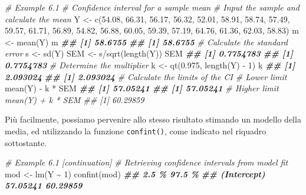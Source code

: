 \documentclass[
  12pt,
]{book}
\newenvironment{Shaded}{\begin{snugshade}}{\end{snugshade}}
\newcommand{\CommentTok}[1]{\textcolor[rgb]{0.56,0.35,0.01}{\textit{#1}}}
\newcommand{\DecValTok}[1]{\textcolor[rgb]{0.00,0.00,0.81}{#1}}
\newcommand{\DocumentationTok}[1]{\textcolor[rgb]{0.56,0.35,0.01}{\textbf{\textit{#1}}}}
\newcommand{\FloatTok}[1]{\textcolor[rgb]{0.00,0.00,0.81}{#1}}
\newcommand{\FunctionTok}[1]{\textcolor[rgb]{0.00,0.00,0.00}{#1}}
\newcommand{\NormalTok}[1]{#1}
\newcommand{\OtherTok}[1]{\textcolor[rgb]{0.56,0.35,0.01}{#1}}
\newcommand{\SpecialCharTok}[1]{\textcolor[rgb]{0.00,0.00,0.00}{#1}}
\begin{document}
\begin{Shaded}
\begin{Highlighting}[]
\CommentTok{\# Example 6.1}
\CommentTok{\# Confidence interval for a sample mean}
\CommentTok{\# Input the sample and calculate the mean}
\NormalTok{Y }\OtherTok{\textless{}{-}} \FunctionTok{c}\NormalTok{(}\FloatTok{54.08}\NormalTok{, }\FloatTok{66.31}\NormalTok{, }\FloatTok{56.17}\NormalTok{, }\FloatTok{56.32}\NormalTok{, }\FloatTok{52.01}\NormalTok{, }\FloatTok{58.91}\NormalTok{, }\FloatTok{58.74}\NormalTok{, }\FloatTok{57.49}\NormalTok{,}
\FloatTok{59.57}\NormalTok{, }\FloatTok{61.71}\NormalTok{, }\FloatTok{56.89}\NormalTok{, }\FloatTok{54.82}\NormalTok{, }\FloatTok{56.88}\NormalTok{, }\FloatTok{60.05}\NormalTok{, }\FloatTok{59.39}\NormalTok{, }\FloatTok{57.19}\NormalTok{,}
\FloatTok{64.76}\NormalTok{, }\FloatTok{61.36}\NormalTok{, }\FloatTok{62.03}\NormalTok{, }\FloatTok{58.83}\NormalTok{)}
\NormalTok{m }\OtherTok{\textless{}{-}} \FunctionTok{mean}\NormalTok{(Y)}
\NormalTok{m}
\DocumentationTok{\#\# [1] 58.6755}
\DocumentationTok{\#\# [1] 58.6755}
\CommentTok{\# Calculate the standard error}
\NormalTok{s }\OtherTok{\textless{}{-}} \FunctionTok{sd}\NormalTok{(Y)}
\NormalTok{SEM }\OtherTok{\textless{}{-}}\NormalTok{ s}\SpecialCharTok{/}\FunctionTok{sqrt}\NormalTok{(}\FunctionTok{length}\NormalTok{(Y))}
\NormalTok{SEM}
\DocumentationTok{\#\# [1] 0.7754783}
\DocumentationTok{\#\# [1] 0.7754783}
\CommentTok{\# Determine the multiplier}
\NormalTok{k }\OtherTok{\textless{}{-}} \FunctionTok{qt}\NormalTok{(}\FloatTok{0.975}\NormalTok{, }\FunctionTok{length}\NormalTok{(Y) }\SpecialCharTok{{-}} \DecValTok{1}\NormalTok{)}
\NormalTok{k}
\DocumentationTok{\#\# [1] 2.093024}
\DocumentationTok{\#\# [1] 2.093024}
\CommentTok{\# Calculate the limits of the CI \# Lower limit}
\FunctionTok{mean}\NormalTok{(Y) }\SpecialCharTok{{-}}\NormalTok{ k }\SpecialCharTok{*}\NormalTok{ SEM}
\DocumentationTok{\#\# [1] 57.05241}
\DocumentationTok{\#\# [1] 57.05241}
\CommentTok{\# Higher limit mean(Y) + k * SEM \#\# [1] 60.29859}
\end{Highlighting}
\end{Shaded}

Più facilmente, possiamo pervenire allo stesso risultato stimando un modello della media, ed utilizzando la funzione \texttt{confint()}, come indicato nel riquadro sottostante.

\begin{Shaded}
\begin{Highlighting}[]
\CommentTok{\# Example 6.1 [continuation]}
\CommentTok{\# Retrieving confidence intervals from model fit}
\NormalTok{mod }\OtherTok{\textless{}{-}} \FunctionTok{lm}\NormalTok{(Y }\SpecialCharTok{\textasciitilde{}} \DecValTok{1}\NormalTok{)}
\FunctionTok{confint}\NormalTok{(mod)}
\DocumentationTok{\#\#                2.5 \%   97.5 \%}
\DocumentationTok{\#\# (Intercept) 57.05241 60.29859}
\end{Highlighting}
\end{Shaded}
\end{document}
